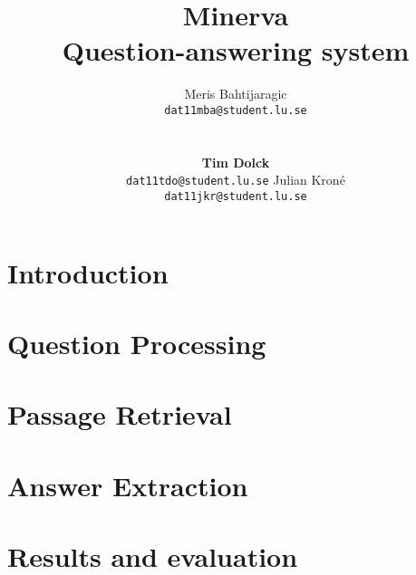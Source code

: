 \documentclass[11pt,letterpaper]{article}
\title{Minerva \\ Question-answering system}
\author{Meris Bahtijaragic\\
	    {\tt dat11mba@student.lu.se}
	    \And
      \\
      \\
      \\
      \textbf{Tim Dolck}\\
      {\tt dat11tdo@student.lu.se}
      \And
      Julian Kron\'{e}\\
      {\tt dat11jkr@student.lu.se}
}
\date{}
\begin{document}
\maketitle
\begin{abstract}

\end{abstract}
\section{Introduction}

\section{Question Processing}

\section{Passage Retrieval}

\section{Answer Extraction}

\section{Results and evaluation}

\end{document}
